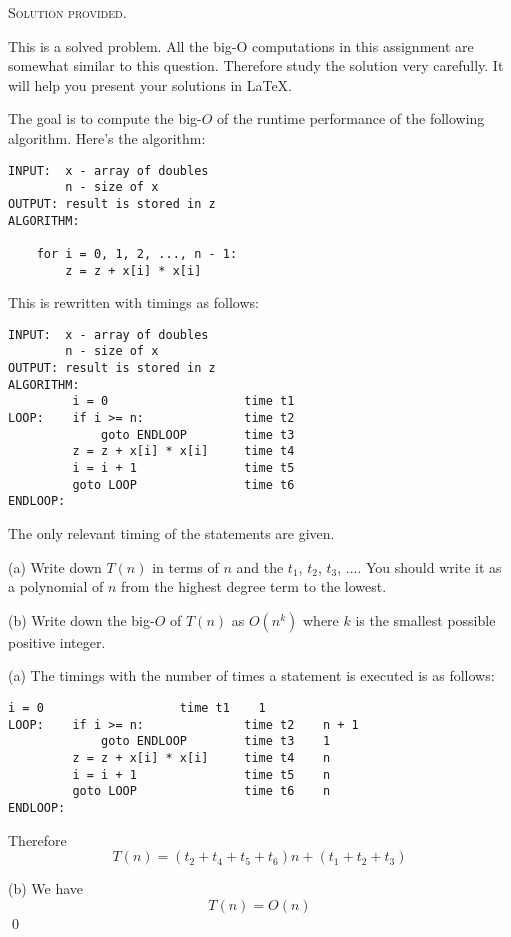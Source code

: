 
\textsc{Solution provided.}


This is a solved problem.
All the big-O computations in this assignment
are somewhat similar to this question.
Therefore study the solution very carefully.
It will help you present your solutions in \LaTeX.

The goal is to compute the big-$O$ of the runtime performance
of the following algorithm. 
Here's the algorithm:
\begin{Verbatim}[frame=single]
INPUT:  x - array of doubles
        n - size of x        
OUTPUT: result is stored in z
ALGORITHM:

    for i = 0, 1, 2, ..., n - 1:
        z = z + x[i] * x[i]
\end{Verbatim}
This is rewritten with timings as follows:
\begin{Verbatim}[frame=single]
INPUT:  x - array of doubles
        n - size of x
OUTPUT: result is stored in z
ALGORITHM:                      
         i = 0                   time t1     
LOOP:    if i >= n:              time t2      
             goto ENDLOOP        time t3      
         z = z + x[i] * x[i]     time t4      
         i = i + 1               time t5
         goto LOOP               time t6
ENDLOOP:
\end{Verbatim}
The only relevant timing of the statements are given.


(a) Write down $T(n)$ in terms of $n$ and the 
$t_1$, $t_2$, $t_3$, ....
You should write it as a polynomial of $n$ from the highest
degree term to the lowest.

(b) Write down the big-$O$ of $T(n)$ as $O(n^k)$
where $k$ is the smallest possible  positive integer.

(a)
The timings with the number of times a statement is executed is as follows:
\begin{Verbatim}[frame=single]
         i = 0                   time t1    1
LOOP:    if i >= n:              time t2    n + 1
             goto ENDLOOP        time t3    1 
         z = z + x[i] * x[i]     time t4    n
         i = i + 1               time t5    n
         goto LOOP               time t6    n
ENDLOOP:
\end{Verbatim}
Therefore
\[
T(n) = (t_2 + t_4 + t_5 + t_6)n + (t_1 + t_2 + t_3)
\]

(b)
We have
\[
T(n) = O(n)
\]
\qed
